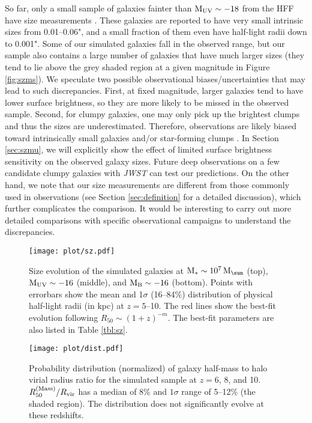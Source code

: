 \documentclass[useAMS,usenatbib]{mn2e}
\newcommand{\Ms}{{\rm M}_{\ast}}
\newcommand{\Msun}{{\rm M}_{\sun}}
\newcommand{\referee}[1]{{\color{black}#1}}
\begin{document}
So far, only a small sample of galaxies fainter than $\rm M_{UV}\sim-18$ from the HFF have size measurements \citep{kawamata.2015:hff.size.z6to8,bouwens.2017:small.galaxy.sizes}. These galaxies are reported to have very small intrinsic sizes from 0.01--0.06", and a small fraction of them even have half-light radii down to 0.001". Some of our simulated galaxies fall in the observed range, but our sample also contains a large number of galaxies that have much larger sizes (they tend to lie above the grey shaded region at a given magnitude in Figure \ref{fig:szms}). We speculate two possible observational biases/uncertainties that may lead to such discrepancies. 
First, at fixed magnitude, larger galaxies tend to have lower surface brightness, so they are more likely to be missed in the observed sample. Second, for clumpy galaxies, one may only pick up the brightest clumps and thus the sizes are underestimated. Therefore, observations are likely biased toward intrinsically small galaxies and/or star-forming clumps \citep[e.g.][]{vanzella.2017:globular.formation}. In Section \ref{sec:szmu}, we will explicitly show the effect of limited surface brightness sensitivity on the observed galaxy sizes. Future deep observations on a few candidate clumpy galaxies with {\it JWST} can test our predictions. On the other hand, we note that our size measurements are different from those commonly used in observations (see Section \ref{sec:definition} for a detailed discussion), which further complicates the comparison. It would be interesting to carry out more detailed comparisons with specific observational campaigns to understand the discrepancies.

\begin{figure}
\centering
\texttt{[image: plot/sz.pdf]}
\caption{Size evolution of the simulated galaxies at $\Ms\sim10^7\,\Msun$ (top), $\rm M_{UV}\sim-16$ (middle), and $\rm M_B\sim-16$ (bottom). Points with errorbars show the mean and 1$\sigma$ (16--84\%) distribution of physical half-light radii (in kpc) at $z=5$--10. The red lines show the best-fit evolution following $R_{50}\sim(1+z)^{-m}$. The best-fit parameters are also listed in Table \ref{tbl:sz}.}
\label{fig:sz}
\end{figure}

\begin{figure}
\centering
\texttt{[image: plot/dist.pdf]}
\caption{\referee{Probability distribution (normalized) of galaxy half-mass to halo virial radius ratio for the simulated sample at $z=6$, 8, and 10. $R_{50}^{\rm (Mass)}/R_{\rm vir}$ has a median of 8\% and $1\sigma$ range of 5--12\% (the shaded region). The distribution does not significantly evolve at these redshifts.}}
\label{fig:dist}
\end{figure}
\end{document}
